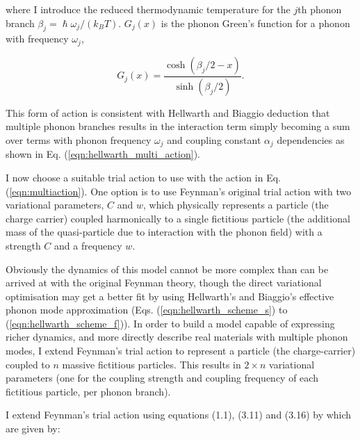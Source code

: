 where I introduce the reduced thermodynamic temperature for the $j$th phonon branch $\beta_j = \hslash \omega_j / (k_B T)$. $G_j(x)$ is the phonon Green's function for a phonon with frequency $\omega_j$, 

\begin{equation}
    G_j(x) = \frac{\cosh{(\beta_j/2-x)}}{\sinh{(\beta_j/2)}} .
\end{equation}

This form of action is consistent with Hellwarth and Biaggio deduction that multiple phonon branches results in the interaction term simply becoming a sum over terms with phonon frequency $\omega_j$ and coupling constant $\alpha_j$ dependencies as shown in Eq. (\ref{eqn:hellwarth_multi_action}). 

I now choose a suitable trial action to use with the action in Eq. (\ref{eqn:multiaction}). One option is to use Feynman's original trial action with two variational parameters, $C$ and $w$, which physically represents a particle (the charge carrier) coupled harmonically to a single fictitious particle (the additional mass of the quasi-particle due to interaction with the phonon field) with a strength $C$ and a frequency $w$. 

Obviously the dynamics of this model cannot be more complex than can be arrived at with the original Feynman theory, though the direct variational optimisation may get a better fit by using Hellwarth's and Biaggio's effective phonon mode approximation (Eqs. (\ref{eqn:hellwarth_scheme_s}) to (\ref{eqn:hellwarth_scheme_f})).
In order to build a model capable of expressing richer dynamics, and more directly describe real materials with multiple phonon modes, I extend Feynman's trial action to represent a particle (the charge-carrier) coupled to $n$ massive fictitious particles. This results in $2\times n$ variational parameters (one for the coupling strength and coupling frequency of each fictitious particle, per phonon branch). 

I extend Feynman's trial action using equations (1.1), (3.11) and (3.16) by \cite{poulter_complete_1992} which are given by:

